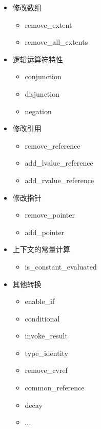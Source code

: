 \begin{itemize}
\item
修改数组

\begin{itemize}
\item
remove\_extent

\item
remove\_all\_extents
\end{itemize}

\item
逻辑运算符特性

\begin{itemize}
\item
conjunction

\item
disjunction

\item
negation
\end{itemize}

\item
修改引用

\begin{itemize}
\item
remove\_reference

\item
add\_lvalue\_reference

\item
add\_rvalue\_reference
\end{itemize}

\item
修改指针

\begin{itemize}
\item
remove\_pointer

\item
add\_pointer
\end{itemize}

\item
上下文的常量计算

\begin{itemize}
\item
is\_constant\_evaluated
\end{itemize}

\item
其他转换

\begin{itemize}
\item
enable\_if

\item
conditional

\item
invoke\_result

\item
type\_identity

\item
remove\_cvref

\item
common\_reference

\item
decay

\item
...
\end{itemize}
\end{itemize}

